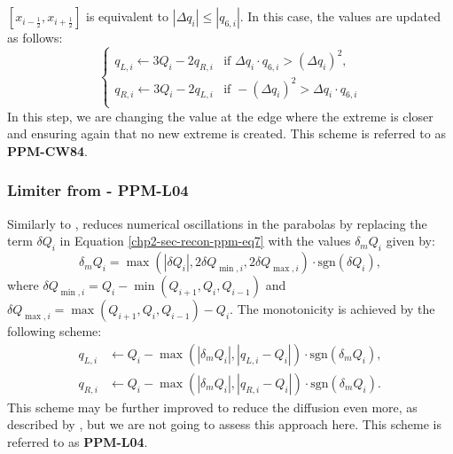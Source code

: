 $[x_{i-\frac{1}{2}},x_{i+\frac{1}{2}}]$ is equivalent to $|\Delta q_i| \leq |q_{6,i}|$.
In this case, the values are updated as follows:
\begin{equation}
	\label{chp2-sec-mono-eq3}
	\begin{cases}
		q_{L,i} \leftarrow 3Q_i - 2q_{R,i}	& 
		\text{if } \Delta q_i \cdot q_{6,i} > (\Delta q_i)^2,\\
		q_{R,i} \leftarrow 3Q_i - 2q_{L,i}	& 
		\text{if } -(\Delta q_i)^2 > \Delta q_i\cdot q_{6,i} \\
	\end{cases}
\end{equation}
In this step, we are changing the value at the edge where the extreme is closer and ensuring
again that no new extreme is created.
This scheme is referred to as \textbf{PPM-CW84}.
\subsubsection{Limiter from \citet{lin:2004} - PPM-L04}
Similarly to \citet{colella:1984}, \citet{lin:2004} reduces numerical oscillations
in the parabolas by replacing the term $\delta Q_i$ in Equation \eqref{chp2-sec-recon-ppm-eq7}
with the values $\delta_m Q_i$ given by:
\begin{equation}
	\label{chp2-sec-mono-eq4}
	\delta_m Q_{i} =
	\max(|\delta Q_i|, 2\delta Q_{\min,i}, 2\delta Q_{\max,i}) \cdot \text{sgn}(\delta Q_i),
\end{equation}
where $\delta Q_{\min,i} = Q_i - \min(Q_{i+1}, Q_i, Q_{i-1})$ and
$\delta Q_{\max,i} = \max(Q_{i+1}, Q_i, Q_{i-1}) - Q_i$.
The monotonicity is achieved by the following scheme:
\begin{align}
	\label{chp2-sec-mono-eq5}
	q_{L,i} &\leftarrow Q_i - \max(|\delta_m Q_i|, |q_{L,i}-Q_i|) \cdot \text{sgn}(\delta_m Q_i),\\
	q_{R,i} &\leftarrow Q_i - \max(|\delta_m Q_i|, |q_{R,i}-Q_i|) \cdot \text{sgn}(\delta_m Q_i).
\end{align}
This scheme may be further improved to reduce the diffusion even more, as described by \citet{lin:2004},
but we are not going to assess this approach here.
This scheme is referred to as \textbf{PPM-L04}.

